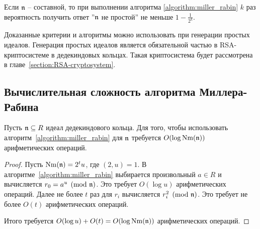 \documentclass[_00_dissertation.tex]{subfiles}
\begin{document}
\begin{remark}
    Если $\mathfrak{n}$ -- составной, то при выполнении алгоритма \ref{algorithm:miller_rabin} $k$ раз вероятность получить ответ ''$\mathfrak{n}$ не простой'' не меньше $1 - \frac{1}{2^k}$.
\end{remark}

\begin{remark}
    Доказанные критерии и алгоритмы можно использовать при генерации простых идеалов.
    Генерация простых идеалов является обязательной частью в RSA-криптосистеме в дедекиндовых кольцах.
    Такая криптосистема будет рассмотрена в главе~\ref{section:RSA-cryptosystem}.
\end{remark}

\subsection{Вычислительная сложность алгоритма Миллера-Рабина}

\begin{statement}
    Пусть $\mathfrak{n} \subseteq R$ идеал дедекиндового кольца.
    Для того, чтобы использовать алгоритм~\ref{algorithm:miller_rabin} для $\mathfrak{n}$ требуется $O(\log \textrm{Nm}(\mathfrak{n}))$ арифметических операций.
\end{statement}
\begin{proof}
    Пусть $\textrm{Nm}(\mathfrak{n}) = 2^t u$, где $(2, u) = 1$.
    В алгоритме~\ref{algorithm:miller_rabin} выбирается произвольный $a \in R$ и вычисляется $r_0 = a^u \pmod{\mathfrak{n}}$.
    Это требует $O(\log u)$ арифметических операций.
    Далее не более $t$ раз для $r_i$ вычисляется $r_i^2 \pmod{\mathfrak{n}}$.
    Это требует не более $O(t)$ арифметических операций.

    Итого требуется $O(\log u) + O(t) = O(\log \textrm{Nm}(\mathfrak{n}))$ арифметических операций.
\end{proof}



	
\end{document}
